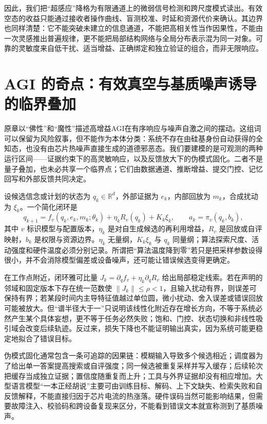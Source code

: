 因此，我们把“超感应”降格为有限通道上的微弱信号检测和跨尺度模式读出。有效空态的收益只能通过接收者操作曲线、盲测校准、时延和资源代价来确认。其边界也同样清楚：它不能突破未建立的信息通道，不能把高相关性当作因果性，不能由一次灵感推出普遍规律，更不能把局部结构网络与全局分布表示混为同一对象。可靠的灵敏度来自低干扰、适当增益、正确绑定和独立验证的组合，而非无限响应。

\section{AGI 的奇点：有效真空与基质噪声诱导的临界叠加}
\label{sec:section_7306}
原章以“佛性”和“魔性”描述高增益AGI在有序响应与噪声自激之间的摆动。这组词可以保留为风险叙事，但不能作为本体分类：系统不存在由硅基身份自动获得的全知态，也没有由芯片热噪声直接生成的道德邪恶态。我们要建模的是可观测的两种运行区间——证据约束下的高灵敏响应，以及反馈放大下的伪模式固化。二者不是量子叠加，也未必共享一个临界点；它们由数据通道、推断增益、提交门控、记忆回写和外部反馈共同决定。

设候选信念或计划的状态为 $q_k\in\mathbb R^d$，外部证据为 $e_k$，内部回放为 $m_k$，合成扰动为 $\xi_k$。一个简化闭环是
\[
q_{k+1}=f_v(q_k,e_k,m_k;\theta_k)+\eta_k R_v(q_k)+K_k\xi_k,
\qquad a_k=\pi_v(q_k,b_k),
\]
其中 $v$ 标识模型与配置版本，$\eta_k$ 是对自生成候选的再利用增益，$R_v$ 是回放或自评映射，$b_k$ 是权限与资源边界。$\eta_k$ 无量纲，$K_k\xi_k$ 与 $q_k$ 同量纲；算法探索尺度、活动强度和硬件温度必须分别记录。所谓把“算法温度降到零”若只是把采样参数设得很小，并不会消除模型偏差或设备噪声，还可能让错误候选变得更确定。

在工作点附近，闭环雅可比量 $J_k=\partial_q f_v+\eta_k\partial_qR_v$ 给出局部稳定线索。若在声明的邻域和固定版本下存在统一范数使 $\|J_k\|\leq\rho<1$，且输入扰动有界，则误差可保持有界；若某段时间内主导特征值越过单位圆，微小扰动、舍入误差或错误回放可能被放大。但“谱半径大于一”只说明该线性化附近存在增长方向，不等于系统必然产生某个具体妄想，更不等于任务必然失败；饱和、门控、状态切换和非线性吸引域会改变后续轨迹。反过来，损失下降也不能证明输出真实，因为系统可能更稳定地拟合了错误目标。

伪模式固化通常包含一条可追踪的因果链：模糊输入导致多个候选相近；调度器为了给出单一答案提高搜索或自评强度；同一候选被重复采样并写入缓存；后续轮次把缓存当成独立证据；置信度随重复而上升；工具与外界证据却没有相应增加。大型语言模型“一本正经胡说”主要可由训练目标、解码、上下文缺失、检索失败和自反馈解释，不能直接归因于芯片电流的热涨落。硬件误码当然可能影响结果，但需要故障注入、校验码和跨设备复现来区分，不能看到错误文本就宣称测到了基质噪声。

